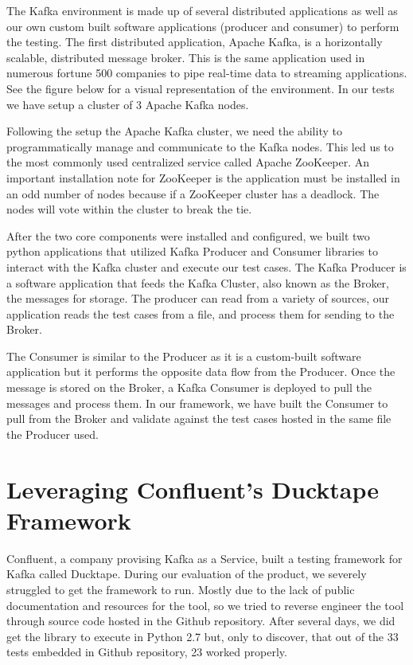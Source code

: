 \begin{multicols}{2}
The Kafka environment is made up of several distributed applications as well as our own custom built software applications (producer and consumer) to perform the testing. \cite{kafkaintro}
The first distributed application, Apache Kafka, is a horizontally scalable, distributed message broker.
This is the same application used in numerous fortune 500 companies to pipe real-time data to streaming applications.
See the figure below for a visual representation of the environment.
In our tests we have setup a cluster of 3 Apache Kafka nodes.


\vspace{1em}
\vspace{1em}


Following the setup the Apache Kafka cluster, we need the ability to programmatically manage and communicate to the Kafka nodes.
This led us to the most commonly used centralized service called Apache ZooKeeper.
An important installation note for ZooKeeper is the application must be installed in an odd number of nodes because if a ZooKeeper cluster has a deadlock.
The nodes will vote within the cluster to break the tie.

After the two core components were installed and configured, we built two python applications that utilized Kafka Producer and Consumer libraries to interact with the Kafka cluster and execute our test cases.
The Kafka Producer is a software application that feeds the Kafka Cluster, also known as the Broker, the messages for storage.
The producer can read from a variety of sources, our application reads the test cases from a file, and process them for sending to the Broker.

The Consumer is similar to the Producer as it is a custom-built software application but it performs the opposite data flow from the Producer.
Once the message is stored on the Broker, a Kafka Consumer is deployed to pull the messages and process them.
In our framework, we have built the Consumer to pull from the Broker and validate against the test cases hosted in the same file the Producer used.

\section{Leveraging Confluent's Ducktape Framework}
Confluent, a company provising Kafka as a Service, built a testing framework for Kafka called Ducktape.
During our evaluation of the product, we severely struggled to get the framework to run.
Mostly due to the lack of public documentation and resources for the tool, so we tried to reverse engineer the tool through source code hosted in the Github repository.
After several days, we did get the library to execute in Python 2.7 but, only to discover, that out of the 33 tests embedded in Github repository, 23 worked properly.


\end{multicols}

